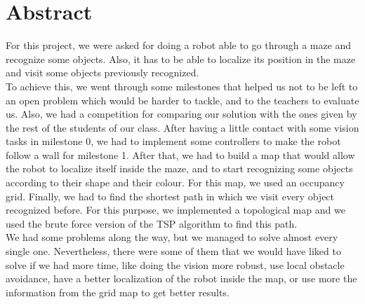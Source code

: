 \section{Abstract}

For this project, we were asked for doing a robot able to go through a maze and recognize some objects.
Also, it has to be able to localize its position in the maze and visit some objects previously recognized.\\

To achieve this, we went through some milestones that helped us not to be left to an open problem which would be harder to tackle, and to the teachers to evaluate us.
Also, we had a competition for comparing our solution with the ones given by the rest of the students of our class.
After having a little contact with some vision tasks in milestone 0, we had to implement some controllers to make the robot follow a wall for milestone 1.
After that, we had to build a map that would allow the robot to localize itself inside the maze, and to start recognizing some objects according to their shape and their colour.
For this map, we used an occupancy grid.
Finally, we had to find the shortest path in which we visit every object recognized before.
For this purpose, we implemented a topological map and we used the brute force version of the TSP algorithm to find this path.\\

We had some problems along the way, but we managed to solve almost every single one.
Nevertheless, there were some of them that we would have liked to solve if we had more time, like doing the vision more robust, use local obstacle avoidance, have a better localization of the robot inside the map, or use more the information from the grid map to get better results.